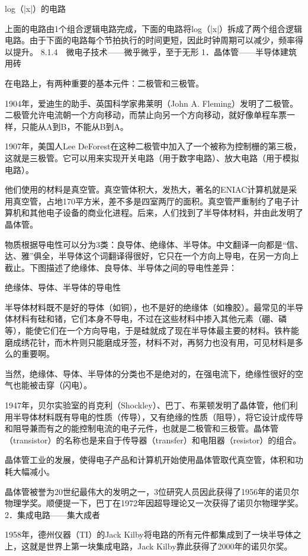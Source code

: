 \documentclass[12pt,UTF8]{ctexbook}
\begin{document}
log（|x|）的电路

上面的电路由1个组合逻辑电路完成，下面的电路将log（|x|）拆成了两个组合逻辑电路。由于下面的电路每个节拍执行的时间更短，因此时钟周期可以减少，频率得以提升。
8.1.4　微电子技术——微乎微乎，至于无形
1．晶体管——半导体建筑用砖

在电路上，有两种重要的基本元件：二极管和三极管。

1904年，爱迪生的助手、英国科学家弗莱明（John A. Fleming）发明了二极管。二极管允许电流朝一个方向移动，而禁止向另一个方向移动，就好像单程车票一样，只能从A到B，不能从B到A。

1907年，美国人Lee DeForest在这种二极管中加入了一个被称为控制栅的第三极，这就是三极管。它可以用来实现开关电路（用于数字电路）、放大电路（用于模拟电路）。

他们使用的材料是真空管。真空管体积大，发热大，著名的ENIAC计算机就是采用真空管，占地170平方米，差不多是四室两厅的面积。真空管严重制约了电子计算机和其他电子设备的商业化进程。后来，人们找到了半导体材料，并由此发明了晶体管。

物质根据导电性可以分为3类：良导体、绝缘体、半导体。中文翻译一向都是“信、达、雅”俱全，半导体这个词翻译得很好，它只在一个方向上导电，在另一方向上截止。下图描述了绝缘体、良导体、半导体之间的导电性差异：

绝缘体、导体、半导体的导电性

半导体材料既不是好的导体（如铜），也不是好的绝缘体（如橡胶）。最常见的半导体材料有硅和锗，它们本身不导电，不过在这些材料中掺入其他元素（硼、磷等），能使它们在一个方向导电，于是硅就成了现在半导体最主要的材料。铁杵能磨成绣花针，而木杵则只能磨成牙签，材料不对，再努力也没有用，可见材料是多么的重要啊。

当然，绝缘体、导体、半导体的分类也不是绝对的，在强电流下，绝缘性很好的空气也能被击穿（闪电）。

1947年，贝尔实验室的肖克利（Shockley）、巴丁、布莱顿发明了晶体管，他们利用半导体材料既有导电的性质（传导），又有绝缘的性质（阻导），将它设计成传导和阻导兼而有之的能控制电流的电子元件，也就是二极管和三极管。晶体管（transistor）的名称也是来自于传导器（transfer）和电阻器（resistor）的组合。

晶体管工业的发展，使得电子产品和计算机开始使用晶体管取代真空管，体积和功耗大幅减小。

晶体管被誉为20世纪最伟大的发明之一，3位研究人员因此获得了1956年的诺贝尔物理学奖。顺便提一下，巴丁在1972年因超导理论又一次获得了诺贝尔物理学奖。
2．集成电路——集大成者

1958年，德州仪器（TI）的Jack Kilby将电路的所有元件都集成到了一块半导体之上，这就是世界上第一块集成电路，Jack Kilby靠此获得了2000年的诺贝尔奖。
\end{document}

